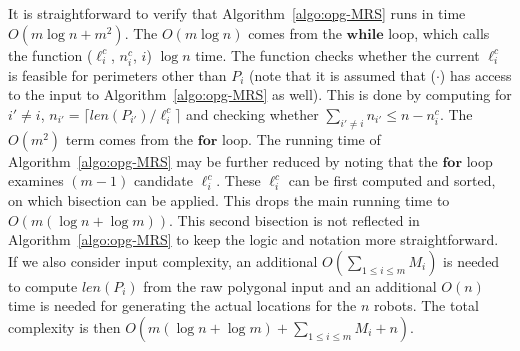 It is straightforward to verify that Algorithm~\ref{algo:opg-MRS} runs in 
time $O(m\log n + m^2)$. The $O(m\log n)$ comes from the $\mathbf{while}$ 
loop, which calls the function \isLFeasible($\ell_i^c$, $n_i^c$, $i$) 
$\log n$ time. The function checks whether the current $\ell_i^c$ is 
feasible for perimeters other than $P_i$ (note that it is assumed that 
\isLFeasible($\cdot$) has access to the input to Algorithm~\ref{algo:opg-MRS} 
as well). This is done by computing for $i' \ne i$, $n_{i'} = \lceil 
len(P_{i'})/\ell_i^c \rceil$ and checking whether $\sum_{{i'} \ne i}n_{i'} 
\le n - n_i^c$. The $O(m^2)$ term comes from the $\mathbf{for}$ loop. 
The running time of Algorithm~\ref{algo:opg-MRS} may be further reduced by 
noting that the $\mathbf{for}$ loop examines $(m-1)$ candidate 
$\ell_i^c$. These $\ell_i^c$ can be first computed and sorted, on which 
bisection can be applied. This drops the main running time to 
$O(m(\log n + \log m))$. This second bisection is not reflected in 
Algorithm~\ref{algo:opg-MRS} to keep the logic and notation more 
straightforward. If we also consider input complexity, an additional 
$O(\sum_{1\le i \le m} M_i)$ is needed to compute $len(P_i)$ from the raw polygonal 
input and an additional $O(n)$ time is needed for generating the actual
locations for the $n$ robots. The total complexity is then $O(m(\log n + 
\log m) + \sum_{1\le i \le m} M_i + n)$.
\vspace*{-3mm}
